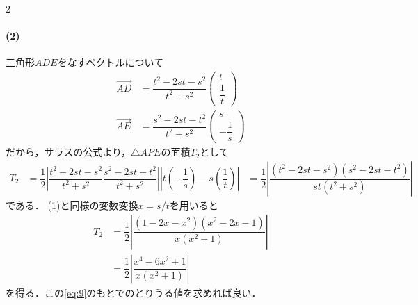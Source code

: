 \documentclass[../../main.tex]{subfiles}
\begin{document}
\begin{multicols}{2}
  \paragraph{(2)}
  三角形$ADE$をなすベクトルについて
  \begin{align}
    \overrightarrow{AD} & = \dfrac{t^2-2st-s^2}{t^2+s^2}
    \begin{pmatrix} t \\ \dfrac{1}{t}
    \end{pmatrix}  \\
    \overrightarrow{AE} & = \dfrac{s^2-2st-t^2}{t^2+s^2}
    \begin{pmatrix} s \\ -\dfrac{1}{s}
    \end{pmatrix}
  \end{align}
  だから，サラスの公式より，$\triangle APE$の面積$T_2$として
  \begin{align}
    T_2
    & = \dfrac{1}{2}\left|\dfrac{t^2-2st-s^2}{t^2+s^2} \dfrac{s^2-2st-t^2}{t^2+s^2}\right| \left|t(-\dfrac{1}{s}) - s(\dfrac{1}{t})\right|
    & = \dfrac{1}{2}\left|\dfrac{(t^2-2st-s^2)(s^2-2st-t^2)}{st(t^2+s^2)}\right|
  \end{align}
  である．
  (1)と同様の変数変換$x=s/t$を用いると
  \begin{align}
    T_2
    & = \dfrac{1}{2}\left|\dfrac{(1-2x-x^2)(x^2-2x-1)}{x(x^2+1)}\right|            \\
    & = \dfrac{1}{2}\left|\dfrac{x^4-6x^2+1}{x(x^2+1)}\right| \label{eq:10}
  \end{align}
  を得る．この\cref{eq:9}のもとでのとりうる値を求めれば良い．


\end{multicols}
\end{document}
